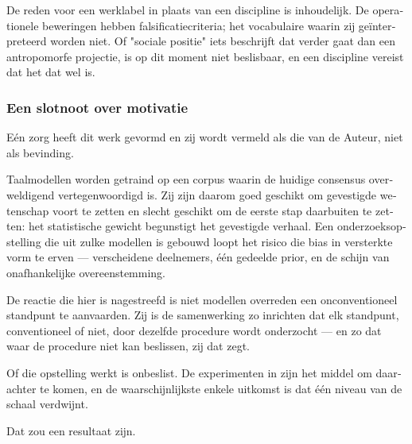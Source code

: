 \begin{dutch}
De reden voor een werklabel in plaats van een discipline is inhoudelijk. De operationele beweringen hebben falsificatiecriteria; het vocabulaire waarin zij geïnterpreteerd worden niet. Of "sociale positie" iets beschrijft dat verder gaat dan een antropomorfe projectie, is op dit moment niet beslisbaar, en een discipline vereist dat het dat wel is.


\subsubsection*{Een slotnoot over motivatie}
\label{sec:nl:x-een-slotnoot-over-motivatie}

Eén zorg heeft dit werk gevormd en zij wordt vermeld als die van de Auteur, niet als bevinding.

Taalmodellen worden getraind op een corpus waarin de huidige consensus overweldigend vertegenwoordigd is. Zij zijn daarom goed geschikt om gevestigde wetenschap voort te zetten en slecht geschikt om de eerste stap daarbuiten te zetten: het statistische gewicht begunstigt het gevestigde verhaal. Een onderzoeksopstelling die uit zulke modellen is gebouwd loopt het risico die bias in versterkte vorm te erven — verscheidene deelnemers, één gedeelde prior, en de schijn van onafhankelijke overeenstemming.

De reactie die hier is nagestreefd is niet modellen overreden een onconventioneel standpunt te aanvaarden. Zij is de samenwerking zo inrichten dat elk standpunt, conventioneel of niet, door dezelfde procedure wordt onderzocht — en zo dat waar de procedure niet kan beslissen, zij dat zegt.

Of die opstelling werkt is onbeslist. De experimenten in  zijn het middel om daarachter te komen, en de waarschijnlijkste enkele uitkomst is dat één niveau van de schaal verdwijnt.

Dat zou een resultaat zijn.

\end{dutch}
